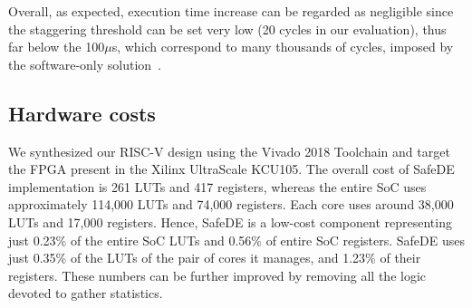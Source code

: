 Overall, as expected, execution time increase can be regarded as negligible since the staggering threshold can be set very low (20 cycles in our evaluation), thus far below the 100$\mu$s, which correspond to many thousands of cycles, imposed by the software-only solution~\cite{SergiDFT}.






\subsection{Hardware costs}

We synthesized our RISC-V design using the Vivado 2018 Toolchain and target the FPGA present in the Xilinx UltraScale KCU105. The overall cost of SafeDE implementation is 261 LUTs and 417 registers, whereas the entire SoC uses approximately 114,000 LUTs and 74,000 registers. Each core uses around 38,000 LUTs and 17,000 registers. Hence, SafeDE is a low-cost component representing just 0.23\% of the entire SoC LUTs and 0.56\% of entire SoC registers. SafeDE uses just 0.35\% of the LUTs of the pair of cores it manages, and 1.23\% of their registers. These numbers can be further improved by removing all the logic devoted to gather statistics. 

